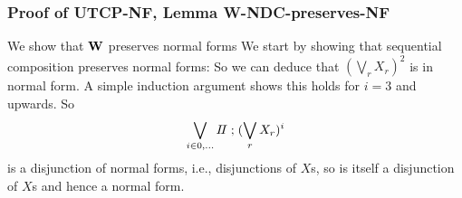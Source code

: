 \subsubsection{Proof of \textsf{UTCP-NF}, Lemma \textsf{W-NDC-preserves-NF}}

We show that $\mathbf{W}$ preserves normal forms
We start by showing that sequential composition preserves normal forms:
So we can deduce that $(\bigvee_r X_r)^2$ is in normal form.
A simple induction argument shows this holds for $i=3$ and upwards.
So
\[
  \bigvee_{i \in 0,\dots} I\!I \mathrel{;} (\bigvee_r X_r)^i
\]
is a disjunction of normal forms,
i.e., disjunctions of $X$s,
so is itself a disjunction of $X$s and hence a normal form.

